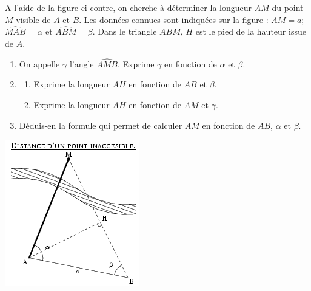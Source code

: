 
\begin{multicols}{2}
A l'aide de la figure ci-contre, on
  cherche à déterminer la longueur $AM$ du point $M$ visible de $A$ et
  $B$. Les données connues sont indiquées sur la figure : $AM=a$;
  $\widehat{MAB}=\alpha$ et $\widehat{ABM}=\beta$. Dans le triangle
  $ABM$, $H$ est le pied de la hauteur issue de $A$.
  \begin{enumerate}
    \item On appelle $\gamma$ l'angle $\widehat{AMB}$. Exprime
      $\gamma$ en fonction de $\alpha$ et $\beta$.
    \item 
      \begin{enumerate}
      \item Exprime la longueur $AH$ en fonction de $AB$ et $\beta$.
      \item Exprime la longueur $AH$ en fonction de $AM$ et $\gamma$.
      \end{enumerate}
    \item Déduis-en la formule qui permet de calculer $AM$ en fonction
      de $AB$, $\alpha$ et $\beta$.
  \end{enumerate}
 \includegraphics[scale=1]{TR-215.png}  
  \end{multicols}